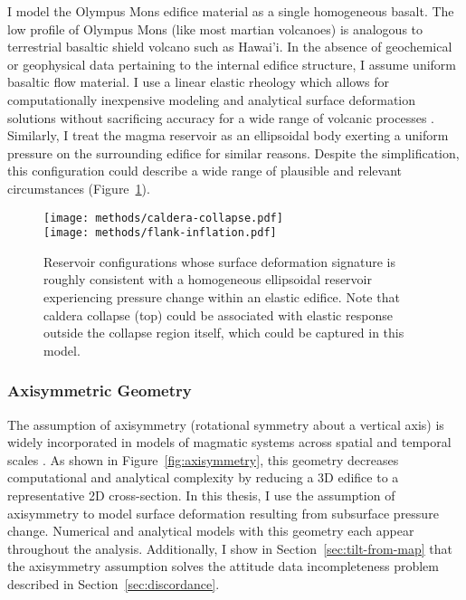 I model the Olympus Mons edifice material as a single homogeneous basalt. The low profile of Olympus Mons (like most martian volcanoes) is analogous to terrestrial basaltic shield volcano such as Hawai'i. In the absence of geochemical or geophysical data pertaining to the internal edifice structure, I assume uniform basaltic flow material. I use a linear elastic rheology which allows for computationally inexpensive modeling and analytical surface deformation solutions \parencite{mogi_relations_1958} without sacrificing accuracy for a wide range of volcanic processes \parencite{grosfils_elastic_2015}. Similarly, I treat the magma reservoir as an ellipsoidal body exerting a uniform pressure on the surrounding edifice for similar reasons. %
Despite the simplification, this configuration could describe a wide range of plausible and relevant circumstances (Figure~\ref{fig:reservoir-configs}).

\begin{figure}
    \texttt{[image: methods/caldera-collapse.pdf]}\\
    \vspace{2cm}
    \texttt{[image: methods/flank-inflation.pdf]}
    \caption[Ellipsoidal reservoir configurations]{Reservoir configurations whose surface deformation signature is roughly consistent with a homogeneous ellipsoidal reservoir experiencing pressure change within an elastic edifice. Note that caldera collapse (top) could be associated with elastic response outside the collapse region itself, which could be captured in this model.} %
    \label{fig:reservoir-configs}
\end{figure}

\subsubsection{Axisymmetric Geometry}

The assumption of axisymmetry (rotational symmetry about a vertical axis) is widely incorporated in models of magmatic systems across spatial and temporal scales \parencite[c.f.,][]{redmond_numerical_2004,ogawa_four-stage_2021,mogi_relations_1958,mctigue_elastic_1987}. As shown in Figure~\ref{fig:axisymmetry}, this geometry decreases computational and analytical complexity by reducing a 3D edifice to a representative 2D cross-section. In this thesis, I use the assumption of axisymmetry to model surface deformation resulting from subsurface pressure change. Numerical and analytical models with this geometry each appear throughout the analysis. Additionally, I show in Section~\ref{sec:tilt-from-map} that the axisymmetry assumption solves the attitude data incompleteness problem described in Section~\ref{sec:discordance}.

